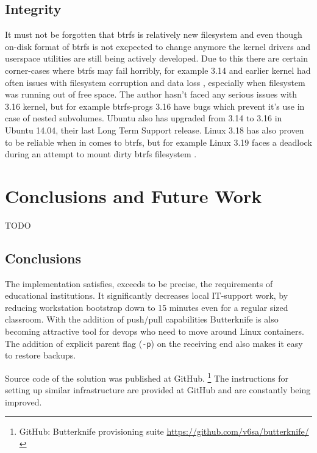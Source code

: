 \documentclass[a4paper,11pt]{kth-mag}
\begin{document}
\section{Integrity}

It must not be forgotten that \acrshort{btrfs} is relatively
new filesystem and even though on-disk format of
\acrshort{btrfs} is not excpected to change anymore
the kernel drivers and userspace utilities are
still being actively developed.
Due to this there are certain corner-cases where
\acrshort{btrfs} may fail horribly,
for example 3.14 and earlier kernel had often issues
with filesystem corruption and data loss
\cite{btrfs-corruption},
especially when filesystem was running out of free space.
The author hasn't faced any serious issues with
3.16 kernel, but for example btrfs-progs 3.16 have
bugs which prevent it's use in case of nested subvolumes.
Ubuntu also has upgraded from 3.14 to 3.16 in Ubuntu 14.04,
their last Long Term Support release.
Linux 3.18 has also proven to be reliable when in comes
to \acrshort{btrfs}, but for example Linux 3.19 faces
a deadlock during an attempt to mount
dirty \acrshort{btrfs} filesystem
\cite{btrfs-dirty-mount-deadlock}.


%
%
%
%

\chapter{Conclusions and Future Work}
\label{chap:conc}

TODO



\section{Conclusions}

The implementation satisfies, exceeds to be precise,
the requirements of educational institutions.
It significantly decreases local IT-support work,
by reducing workstation bootstrap down to 15 minutes even for
a regular sized classroom.
With the addition of push/pull capabilities
Butterknife is also becoming attractive tool
for devops who need to move around Linux containers.
The addition of explicit parent flag (\lstinline!-p!) on
the receiving end also makes it easy to
restore backups.

Source code of the solution was published at GitHub.
\footnote{GitHub: Butterknife provisioning suite \url{https://github.com/v6sa/butterknife/}}
The instructions for setting up similar infrastructure
are provided at GitHub and are constantly being improved.
\end{document}
